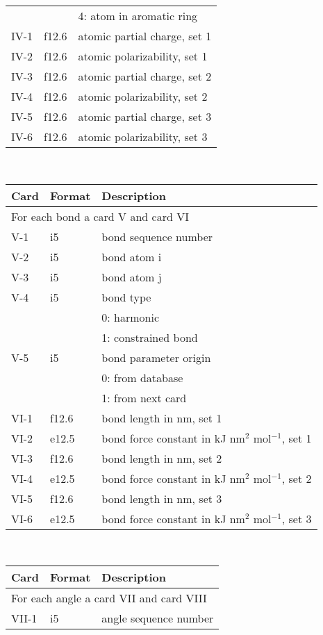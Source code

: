\begin{center}
\begin{tabular}{lll}
      &        & 4: atom in aromatic ring\\
IV-1  & f12.6  & atomic partial charge, set 1\\
IV-2  & f12.6  & atomic polarizability, set 1\\
IV-3  & f12.6  & atomic partial charge, set 2\\
IV-4  & f12.6  & atomic polarizability, set 2\\
IV-5  & f12.6  & atomic partial charge, set 3\\
IV-6  & f12.6  & atomic polarizability, set 3\\
\hline
\end{tabular}\\
\begin{tabular}{lll}
\hline\hline
Card & Format & Description \\ \hline
\multicolumn{3}{l}{For each bond a card V and card VI} \\
V-1   & i5     & bond sequence number \\
V-2   & i5     & bond atom i \\
V-3   & i5     & bond atom j \\
V-4   & i5     & bond type \\
      &        & 0: harmonic\\
      &        & 1: constrained bond\\
V-5   & i5     & bond parameter origin\\
      &        & 0: from database \\
      &        & 1: from next card\\
VI-1  & f12.6  & bond length in nm, set 1\\
VI-2  & e12.5  & bond force constant in kJ nm$^2$ mol$^{-1}$, set 1 \\
VI-3  & f12.6  & bond length in nm, set 2\\
VI-4  & e12.5  & bond force constant in kJ nm$^2$ mol$^{-1}$, set 2 \\
VI-5  & f12.6  & bond length in nm, set 3\\
VI-6  & e12.5  & bond force constant in kJ nm$^2$ mol$^{-1}$, set 3 \\
\hline
\end{tabular}\\
\begin{tabular}{lll}
\hline\hline
Card & Format & Description \\ \hline
\multicolumn{3}{l}{For each angle a card VII and card VIII} \\
VII-1  & i5     & angle sequence number \\

\end{tabular}
\end{center}
